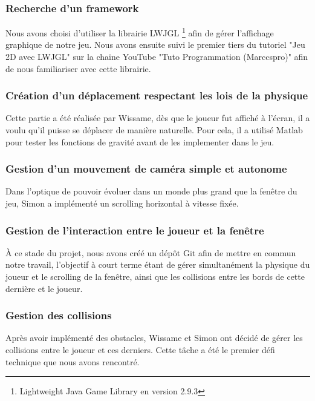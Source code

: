 
\subsubsection{Recherche d'un framework}
Nous avons choisi d'utiliser la librairie LWJGL \footnote{Lightweight Java Game Library en version 2.9.3} afin de gérer l'affichage graphique de notre jeu. Nous avons ensuite suivi le premier tiers du tutoriel "Jeu 2D avec LWJGL" sur la chaine YouTube "Tuto Programmation (Marccspro)" afin de nous familiariser avec cette librairie.

\subsubsection{Création d'un déplacement respectant les lois de la physique}
Cette partie a été réalisée par Wissame, dès que le joueur fut affiché à l'écran, il a voulu qu'il puisse se déplacer de manière naturelle. Pour cela, il a utilisé Matlab pour tester les fonctions de gravité avant de les implementer dans le jeu.

\subsubsection{Gestion d'un mouvement de caméra simple et autonome}
Dans l'optique de pouvoir évoluer dans un monde plus grand que la fenêtre du jeu, Simon a implémenté un scrolling horizontal à vitesse fixée.

\subsubsection{Gestion de l'interaction entre le joueur et la fenêtre}
À ce stade du projet, nous avons créé un dépôt Git afin de mettre en commun notre travail, l'objectif à court terme étant de gérer simultanément la physique du joueur et le scrolling de la fenêtre, ainsi que les collisions entre les bords de cette dernière et le joueur.

\subsubsection{Gestion des collisions}
Après avoir implémenté des obstacles, Wissame et Simon ont décidé de gérer les collisions entre le joueur et ces derniers. Cette tâche a été le premier défi technique que nous avons rencontré.

